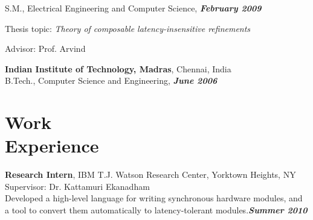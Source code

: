 \documentclass[margin,line]{resume}
\begin{document}
\begin{resume}
\begin{list2}
    \end{list2}\vspace{-3mm}
    S.M., Electrical Engineering and Computer Science, \hfill \textbf{\textit{February 2009}}\\
    \vspace{-3mm}
    \begin{list2}
        \item Thesis topic: \textit{Theory of composable latency-insensitive refinements}
        \item Advisor:  Prof. Arvind
    \end{list2}\vspace{-3mm}
    \textbf{Indian Institute of Technology, Madras}, Chennai, India\\
    B.Tech., Computer Science and Engineering, \hfill \textbf{\textit{June 2006}}\\
    \vspace{-7mm}


    \section{\mysidestyle Work\\Experience}

    \textbf{Research Intern}, IBM T.J. Watson Research Center, Yorktown Heights, NY\\ 
    Supervisor: Dr. Kattamuri Ekanadham \\
    Developed a high-level language for writing synchronous hardware modules,
    and a tool to convert them automatically to latency-tolerant modules.\hfill \textbf{\textit{Summer 2010}}\\


\end{resume}
\end{document}
